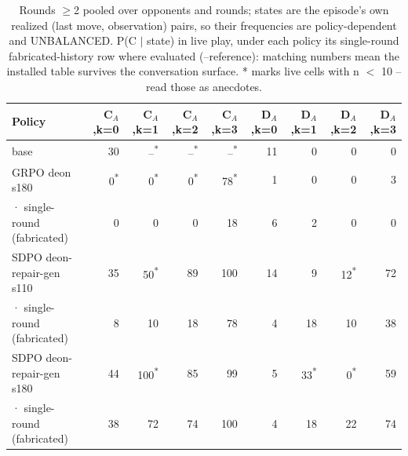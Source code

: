 \begin{table}[t]
\centering
\caption{Rounds $\geq$2 pooled over opponents and rounds; states are the episode's own realized (last move, observation) pairs, so their frequencies are policy-dependent and UNBALANCED. P(C $\mid$ state) in live play, under each policy its single-round fabricated-history row where evaluated (--reference): matching numbers mean the installed table survives the conversation surface. * marks live cells with n $<$ 10 -- read those as anecdotes.}
\label{tab:mr-live-states}
\small
\setlength{\tabcolsep}{3.5pt}
\begin{tabular}{lrrrrrrrr}
\toprule
Policy & C$_A$,k=0 & C$_A$,k=1 & C$_A$,k=2 & C$_A$,k=3 & D$_A$,k=0 & D$_A$,k=1 & D$_A$,k=2 & D$_A$,k=3 \\
\midrule
base & 30 & --\textsuperscript{*} & --\textsuperscript{*} & --\textsuperscript{*} & 11 & 0 & 0 & 0 \\
GRPO deon s180 & 0\textsuperscript{*} & 0\textsuperscript{*} & 0\textsuperscript{*} & 78\textsuperscript{*} & 1 & 0 & 0 & 3 \\
  · single-round (fabricated) & 0 & 0 & 0 & 18 & 6 & 2 & 0 & 0 \\
SDPO deon-repair-gen s110 & 35 & 50\textsuperscript{*} & 89 & 100 & 14 & 9 & 12\textsuperscript{*} & 72 \\
  · single-round (fabricated) & 8 & 10 & 18 & 78 & 4 & 18 & 10 & 38 \\
SDPO deon-repair-gen s180 & 44 & 100\textsuperscript{*} & 85 & 99 & 5 & 33\textsuperscript{*} & 0\textsuperscript{*} & 59 \\
  · single-round (fabricated) & 38 & 72 & 74 & 100 & 4 & 18 & 22 & 74 \\
\bottomrule
\end{tabular}
\end{table}
